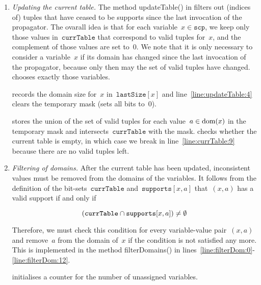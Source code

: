 \documentclass[a4paper,11pt]{article}
\newcommand{\Scp}{\texttt{scp}}
\newcommand{\CurrTable}{\texttt{currTable}}
\newcommand{\LastSizes}{\texttt{lastSize}}
\newcommand{\Supports}{\texttt{supports}}
\begin{document}
\begin{enumerate}
\item \textit{Updating the current table.} 
  The method updateTable() in 
   filters out (indices of)
  tuples that have ceased to be supports since the last invocation of the
  propagator. The ovarall idea is that for each variable~$x \in \Scp$, we keep 
  only those values in~$\CurrTable$ that correspond to valid tuples for~$x$, and the
  complement of those values are set to~$0$. We note that
  it is only necessary to consider a variable~$x$ if its domain has changed
  since the last invocation of the propagator, because only then
  may the set of valid tuples have changed.~
  chooses exactly those variables.

   records the domain size for~$x$ in~$\LastSizes[x]$
  and line~\ref{line:updateTable:4} clears the temporary mask (sets all bits to~$0$).

   stores the union of the
  set of valid tuples for each value~$a \in \text{dom}(x)$ in the temporary mask
  and  intersects~$\CurrTable$ with the mask.
   checks whether the current table is empty,
  in which case we break in line~\ref{line:currTable:9}
  because there are no valid tuples left.

\item 
  \textit{Filtering of domains.}
  After the current table has been updated, inconsistent values must be removed
  from the domains of the variables.   
  It follows from the definition of the bit-sets~$\CurrTable$ and~$\Supports[x,a]$
  that~$(x,a)$ has a valid support if and only if 

  \begin{equation}
    \label{eq:validcond}
    (\CurrTable \Inter \Supports[x,a]) \neq \emptyset
  \end{equation}

  Therefore, we must check this condition for every variable-value pair~$(x,a)$ and
  remove~$a$ from the domain of~$x$ if the condition is not satisfied any more.
  This is implemented in the method filterDomains()
  in lines~\ref{line:filterDom:0}-\ref{line:filterDom:12}.

   initialises a counter for the number of unassigned
  variables.


\end{enumerate}
\end{document}

